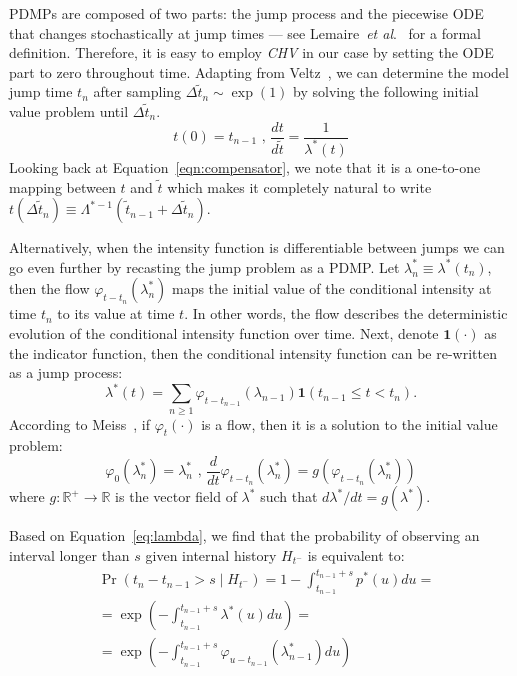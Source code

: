 \documentclass{juliacon}
\numberwithin{equation}{section}
\newcommand{\etal}{\textit{et al}.}
\begin{document}
PDMPs are composed of two parts: the jump process and the piecewise ODE that changes stochastically at jump times --- see Lemaire~\etal~\cite{lemaire2018} for a formal definition. Therefore, it is easy to employ \textit{CHV} in our case by setting the ODE part to zero throughout time. Adapting from Veltz~\cite{veltz2015}, we can determine the model jump time \( t_n \) after sampling \( \Delta \tilde{t}_n \sim \exp(1) \) by solving the following initial value problem until \( \Delta \tilde{t}_n \).
\begin{equation} \label{eqn:chv-simple}
    t (0) = t_{n-1} \text{ , } \frac{d t}{d \tilde{t} } = \frac{1}{\lambda^\ast (t)}
\end{equation}
Looking back at Equation~\ref{eqn:compensator}, we note that it is a one-to-one mapping between \( t \) and \( \tilde{t} \) which makes it completely natural to write \( t(\Delta \tilde{t}_n) \equiv \Lambda^{\ast-1} (\tilde{t}_{n-1} + \Delta \tilde{t}_n) \).

Alternatively, when the intensity function is differentiable between jumps we can go even further by recasting the jump problem as a PDMP. Let \( \lambda^\ast_n \equiv \lambda^\ast(t_n) \), then the flow \( \varphi_{t-t_n}( \lambda^\ast_n ) \) maps the initial value of the conditional intensity at time \( t_n \) to its value at time \( t \). In other words, the flow describes the deterministic evolution of the conditional intensity function over time. Next, denote \( \mathbf{1}( \cdot ) \) as the indicator function, then the conditional intensity function can be re-written as a jump process:
\begin{equation} \label{eqn:conditional-jump}
  \lambda^\ast (t) = \sum_{n \geq 1} \varphi_{t - t_{n-1}} ( \lambda_{n-1} ) \mathbf{1}(t_{n-1} \leq t < t_n).
\end{equation}
According to Meiss~\cite{meiss2017}, if \( \varphi_t ( \cdot ) \) is a flow, then it is a solution to the initial value problem:
\begin{equation}
  \varphi_{0} (\lambda_n^\ast) = \lambda_n^\ast \text{ , }
  \frac{d}{dt} \varphi_{t-t_n} (\lambda_n^\ast) = g(\varphi_{t-t_n} (\lambda_n^\ast))
\end{equation}
where \( g: \mathbb{R}^+ \to \mathbb{R} \) is the vector field of \( \lambda^\ast \) such that \( d \lambda^\ast / dt = g( \lambda^\ast ) \).

Based on Equation~\ref{eq:lambda}, we find that the probability of observing an interval longer than \( s \) given internal history \( H_{t^-} \) is equivalent to:
\begin{equation} \label{eqn:transition-rate}
\begin{split}
  &\Pr(t_n - t_{n-1} > s \mid H_{t^-}) = 1 - \int_{t_{n-1}}^{t_{n-1} + s} p^\ast(u) du = \\
    &=\exp \left( -\int_{t_{n-1}}^{t_{n-1} + s} \lambda^\ast (u) du \right) = \\
    &=\exp \left( -\int_{t_{n-1}}^{t_{n-1} + s} \varphi_{u-t_{n-1}} (\lambda_{n-1}^\ast) du \right)
\end{split}
\end{equation}
\end{document}

